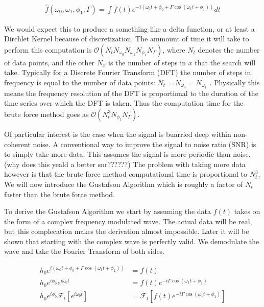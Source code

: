 \documentclass[onecolumn, groupedaddress, 10pt]{revtex4-1}
\begin{document}
\begin{align}
\hat{f}(\omega_0, \omega_1, \phi_1, \Gamma) = \int f(t) e^{-i\left( \omega_0 t + \phi_0 + \Gamma \cos (\omega_1 t + \phi_1 ) \right)} dt
\end{align}

We would expect this to produce a something like a delta function, or at least a Dirchlet Kernel because of discretization.  The ammount of time it will take to perform this computation is $\mathcal{O} (N_tN_{\omega_0}N_{\omega_1}N_{\phi_1}N_\Gamma)$, where $N_t$ denotes the number of data points, and the other $N_x$ is the number of steps in $x$ that the search will take.  Typically for a Discrete Fourier Transform (DFT) the number of steps in frequency is equal to the number of data points: $N_t=N_{\omega_0}=N_{\omega_1}$ \cite{}.  Physically this means the frequency resolution of the DFT is proportional to the duration of the time series over which the DFT is taken.  Thus the computation time for the brute force method goes as $\mathcal{O} (N_t^3N_{\phi_1}N_\Gamma)$.  

Of particular interest is the case when the signal is buarried deep within non-coherent noise.  A conventional way to improve the signal to noise ratio (SNR) is to simply take more data.  This assumes the signal is more periodic than noise.  (why does this yeald a better snr??????)  The problem with taking more data however is that the brute force method computational time is proportional to $N_t^3$.  We will now introduce the Gustafson Algorithm which is roughly a factor of $N_t$ faster than the brute force method.

To derive the Gustafson Algorithm we start by assuming the data $f(t)$ takes on the form of a complex frequency modulated wave.  The actual data will be real, but this complecation makes the derivation almost impossible.  Later it will be shown that starting with the complex wave is perfectly valid.  We demodulate the wave and take the Fourier Transform of both sides.

\begin{align}
h_0 e^{i\left( \omega_0 t + \phi_0 + \Gamma \cos (\omega_1 t + \phi_1 ) \right)} &= f(t) 												\\
h_0 e^{i\phi_0} e^{i\omega_0 t} &= f(t) e^{-i\Gamma \cos (\omega_1 t + \phi_1)}															\\
h_0 e^{i\phi_0} \mathcal{F}_t \left[ e^{i\omega_0 t} \right] &= \mathcal{F}_t \left[ f(t) e^{-i\Gamma \cos (\omega_1 t + \phi_1)} \right]
\end{align}
\end{document}
